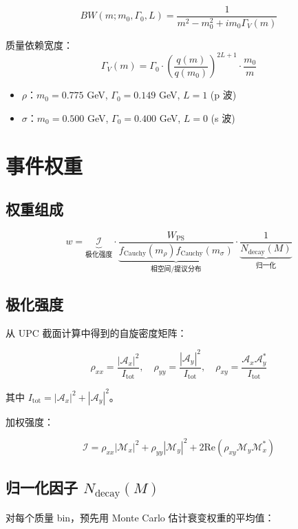 \documentclass[11pt,a4paper,UTF8]{ctexart}
\begin{document}
\[
BW(m; m_0, \Gamma_0, L) = \frac{1}{m^2 - m_0^2 + i m_0 \Gamma_V(m)}
\]

质量依赖宽度：
\[
\Gamma_V(m) = \Gamma_0 \cdot \left(\frac{q(m)}{q(m_0)}\right)^{2L+1} \cdot \frac{m_0}{m}
\]

\begin{itemize}[leftmargin=2em]
    \item $\rho$：$m_0 = 0.775$ GeV, $\Gamma_0 = 0.149$ GeV, $L=1$ (p 波)
    \item $\sigma$：$m_0 = 0.500$ GeV, $\Gamma_0 = 0.400$ GeV, $L=0$ (s 波)
\end{itemize}

\section{事件权重}

\subsection{权重组成}

\[
w = \underbrace{\mathcal{I}}_{\text{极化强度}} \cdot \underbrace{\frac{W_{\text{PS}}}{f_{\text{Cauchy}}(m_\rho) f_{\text{Cauchy}}(m_\sigma)}}_{\text{相空间/提议分布}} \cdot \underbrace{\frac{1}{N_{\text{decay}}(M)}}_{\text{归一化}}
\]

\subsection{极化强度}

从 UPC 截面计算中得到的自旋密度矩阵：

\[
\rho_{xx} = \frac{|\mathcal{A}_x|^2}{I_{\text{tot}}}, \quad \rho_{yy} = \frac{|\mathcal{A}_y|^2}{I_{\text{tot}}}, \quad \rho_{xy} = \frac{\mathcal{A}_x \mathcal{A}_y^*}{I_{\text{tot}}}
\]

其中 $I_{\text{tot}} = |\mathcal{A}_x|^2 + |\mathcal{A}_y|^2$。

加权强度：

\[
\mathcal{I} = \rho_{xx} |\mathcal{M}_x|^2 + \rho_{yy} |\mathcal{M}_y|^2 + 2\text{Re}\left(\rho_{xy} \mathcal{M}_y \mathcal{M}_x^*\right)
\]

\subsection{归一化因子 $N_{\text{decay}}(M)$}

对每个质量 bin，预先用 Monte Carlo 估计衰变权重的平均值：
\end{document}
